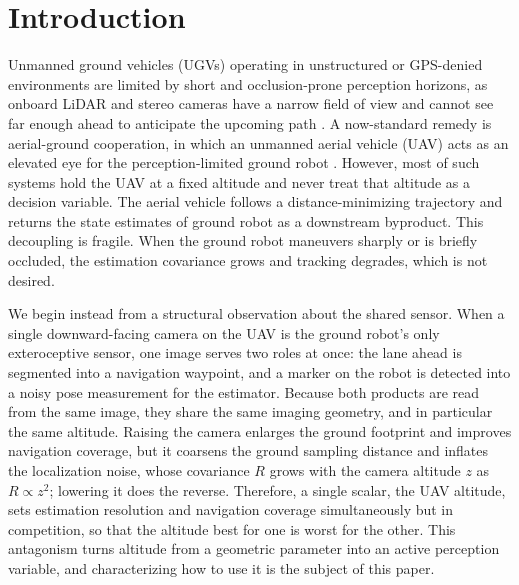 \documentclass{ifacconf}
\newcommand\blfootnote[1]{\begingroup\renewcommand\thefootnote{}\footnotetext{#1}\endgroup}
\begin{document}
\section{Introduction}
\label{sec:intro}
\blfootnote{$^{\dagger}$~denotes equal contribution.}

Unmanned ground vehicles (UGVs) operating in unstructured or GPS-denied environments are limited by short
and occlusion-prone perception horizons, as onboard LiDAR and stereo cameras have a narrow field of view
and cannot see far enough ahead to anticipate the upcoming path \citep{frey2024roadrunner}.
A now-standard remedy is aerial-ground cooperation, in which an unmanned aerial vehicle (UAV) acts as an
elevated eye for the perception-limited ground robot \citep{grocholsky2006cooperative,li2024colag,santos2024aerial}.
However, most of such systems hold the UAV at a fixed altitude and never treat that altitude as a decision
variable. The aerial vehicle follows a distance-minimizing trajectory and returns the state estimates of
ground robot as a downstream byproduct. This decoupling is fragile. When the ground robot maneuvers sharply
or is briefly occluded, the estimation covariance grows and tracking degrades, which is not desired.

We begin instead from a structural observation about the shared sensor. When a single downward-facing
camera on the UAV is the ground robot's only exteroceptive sensor, one image serves two roles at once: the
lane ahead is segmented into a navigation waypoint, and a marker on the robot is detected into a noisy pose
measurement for the estimator. Because both products are read from the same image, they share the same
imaging geometry, and in particular the same altitude. Raising the camera enlarges the ground footprint and
improves navigation coverage, but it coarsens the ground sampling distance and inflates the localization
noise, whose covariance $R$ grows with the camera altitude $z$ as $R\propto z^2$; lowering it does the
reverse. Therefore, a single scalar, the UAV altitude, sets estimation resolution and navigation coverage
simultaneously but in competition, so that the altitude best for one is worst for the other. This
antagonism turns altitude from a geometric parameter into an active perception variable, and characterizing
how to use it is the subject of this paper.
\end{document}
